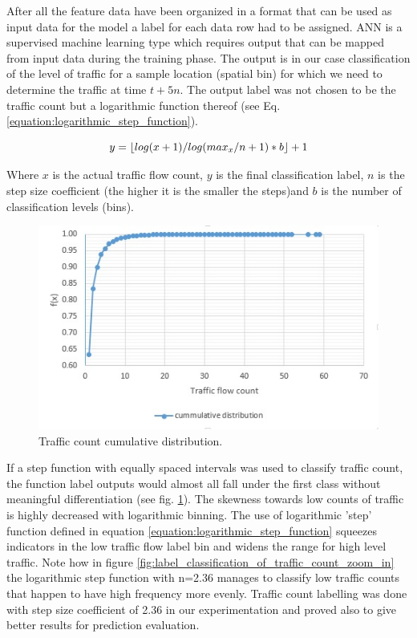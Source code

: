 \documentclass[12pt, a4paper]{report}
\theoremstyle{definition}
\theoremstyle{definition}%
\theoremstyle{definition}%
\theoremstyle{definition}%
\theoremstyle{definition}%
\theoremstyle{definition}%
\begin{document}
After all the feature data have been organized in a format that can be used as input data for the model a label for each data row had to be assigned. ANN is a supervised machine learning type which requires output that can be mapped from input data during the training phase. The output is in our case classification of the level of traffic for a sample location (spatial bin) for which we need to determine the traffic at time $t + 5n$. The output label was not chosen to be the traffic count but a logarithmic function thereof (see Eq. \ref{equation:logarithmic_step_function}).

\begin{equation} \label{equation:logarithmic_step_function}
y=\lfloor{log(x+1)/log(max_x/n + 1) * b}\rfloor + 1  \\
\end{equation}

Where $x$ is the actual traffic flow count, $y$ is the final classification label, $n$ is the step size coefficient (the higher it is the smaller the steps)and $b$ is the number of classification levels (bins). 

\begin{figure}[h]	
	\includegraphics[scale=0.75]{traffic_count_cumm_distribution.jpg}
	\centering
	\caption{Traffic count cumulative distribution. }
	\label{fig:traffic_count_distribution_distribution}
\end{figure}


If a step function with equally spaced intervals was used to classify traffic count, the function label outputs would almost all fall under the first class without meaningful differentiation (see fig. \ref{fig:traffic_count_distribution_distribution}). The skewness towards low counts of traffic is highly decreased with logarithmic binning. The use of logarithmic 'step' function defined in equation \ref{equation:logarithmic_step_function} squeezes indicators in the low traffic flow label bin and widens the range for high level traffic. Note how in figure \ref{fig:label_classification_of_traffic_count_zoom_in} the logarithmic step function with n=2.36 manages to classify  low traffic counts that happen to have high frequency more evenly. Traffic count labelling was done with step size coefficient of 2.36 in our experimentation and proved also to give better results for prediction evaluation.
\end{document}
